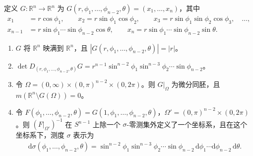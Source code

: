 \documentclass[../../main.tex]{subfiles}%
\begin{document}
\begin{exercise}\label{exercise:ch02-spherical-coordinates}
定义 $G:\mathbb{R}^n\to\mathbb{R}^n$ 为 $G(r,\phi_1,\ldots,\phi_{n-2},\theta)=(x_1,\ldots,x_n)$，其中
\begin{align*}
x_1&=r\cos\phi_1,\qquad x_2=r\sin\phi_1\cos\phi_2,\qquad
x_3=r\sin\phi_1\sin\phi_2\cos\phi_3,\quad\ldots,\\
x_{n-1}&=r\sin\phi_1\cdots\sin\phi_{n-2}\cos\theta,\qquad
x_n=r\sin\phi_1\cdots\sin\phi_{n-2}\sin\theta.
\end{align*}
\begin{enumerate}
\item\label{item:ch02-spherical-map-surjective} $G$ 将 $\mathbb{R}^n$ 映满到 $\mathbb{R}^n$，且 $|G(r,\phi_1,\ldots,\phi_{n-2},\theta)|=|r|$。
\item\label{item:ch02-spherical-jacobian} $\det D_{(r,\phi_1,\ldots,\phi_{n-2},\theta)}G=r^{n-1}\sin^{n-2}\phi_1\sin^{n-3}\phi_2\cdots\sin\phi_{n-2}$。
\item\label{item:ch02-spherical-diffeomorphism} 令 $\Omega=(0,\infty)\times(0,\pi)^{n-2}\times(0,2\pi)$。则 $G|_\Omega$ 为微分同胚，且 $m(\mathbb{R}^n\setminus G(\Omega))=0$。
\item\label{item:ch02-spherical-surface-coordinate} 令 $F(\phi_1,\ldots,\phi_{n-2},\theta)=G(1,\phi_1,\ldots,\phi_{n-2},\theta)$，$\Omega'=(0,\pi)^{n-2}\times(0,2\pi)$。则 $(F|_{\Omega'})^{-1}$ 在 $S^{n-1}$ 上除一个 $\sigma$-零测集外定义了一个坐标系，且在这个坐标系下，测度 $\sigma$ 表示为
\begin{align*}
\mathrm{d}\sigma(\phi_1,\ldots,\phi_{n-2},\theta)
=\sin^{n-2}\phi_1\sin^{n-3}\phi_2\cdots\sin\phi_{n-2}\,
\mathrm{d}\phi_1\cdots\mathrm{d}\phi_{n-2}\,\mathrm{d}\theta.
\end{align*}
\end{enumerate}
\end{exercise}
\end{document}
